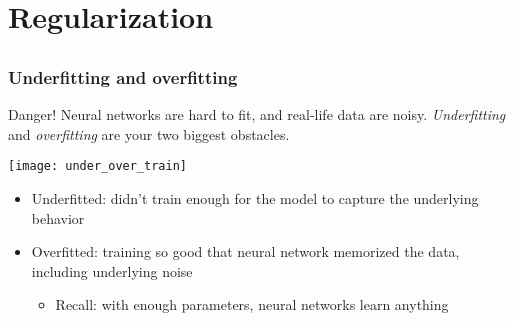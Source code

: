 \section{Regularization}

\subsection{}

\begin{frame}
    \frametitle{Underfitting and overfitting}

    \begin{alertblock}{Danger!}
        Neural networks are hard to fit, and real-life data are noisy.
        \emph{Underfitting} and \emph{overfitting} are your two biggest obstacles.
    \end{alertblock}
    \vspace{1ex}

    \texttt{[image: under\_over\_train]}
    \pause

    \begin{itemize}
        \item Underfitted: didn't train enough for the model to capture the underlying behavior
        \item Overfitted: training so good that neural network memorized the data, including underlying noise
        \begin{itemize}
            \item Recall: with enough parameters, neural networks learn anything
        \end{itemize}
    \end{itemize}
\end{frame}

